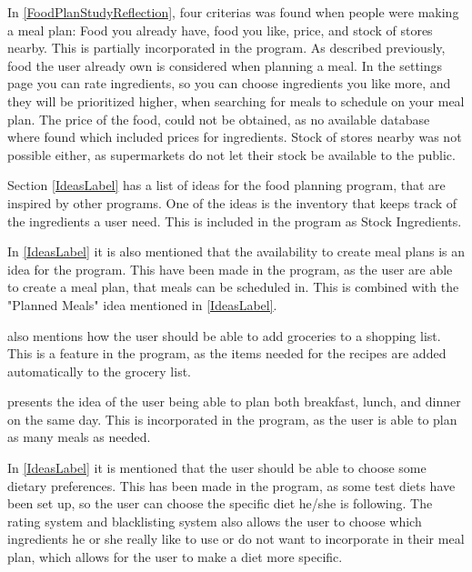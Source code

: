 In \cref{FoodPlanStudyReflection}, four criterias was found when people were making a meal plan: Food you already have, food you like, price, and stock of stores nearby. This is partially incorporated in the program. As described previously, food the user already own is considered when planning a meal. In the settings page you can rate ingredients, so you can choose ingredients you like more, and they will be prioritized higher, when searching for meals to schedule on your meal plan. The price of the food, could not be obtained, as no available database where found which included prices for ingredients. Stock of stores nearby was not possible either, as supermarkets do not let their stock be available to the public.

Section \ref{IdeasLabel} has a list of ideas for the food planning program, that are inspired by other programs. One of the ideas is the inventory that keeps track of the ingredients a user need. This is included in the program as Stock Ingredients. 

In \cref{IdeasLabel} it is also mentioned that the availability to create meal plans is an idea for the program. This have been made in the program, as the user are able to create a meal plan, that meals can be scheduled in. This is combined with the "Planned Meals" idea mentioned in \cref{IdeasLabel}.

 also mentions how the user should be able to add groceries to a shopping list. This is a feature in the program, as the items needed for the recipes are added automatically to the grocery list.

 presents the idea of the user being able to plan both breakfast, lunch, and dinner on the same day. This is incorporated in the program, as the user is able to plan as many meals as needed.

In \cref{IdeasLabel} it is mentioned that the user should be able to choose some dietary preferences. This has been made in the program, as some test diets have been set up, so the user can choose the specific diet he/she is following. The rating system and blacklisting system also allows the user to choose which ingredients he or she really like to use or do not want to incorporate in their meal plan, which allows for the user to make a diet more specific.